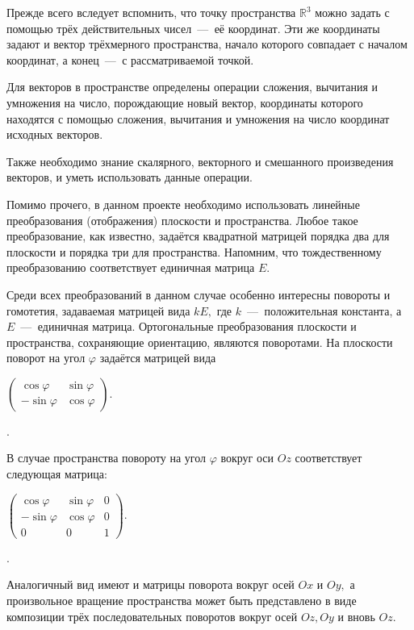 Прежде всего вследует вспомнить, что точку пространства $\mathbb R^3$ можно задать с помощью трёх действительных чисел~---  её координат. Эти же координаты задают и вектор трёхмерного пространства, начало которого совпадает с началом координат, а конец~---  с рассматриваемой точкой.

Для векторов в пространстве определены операции сложения, вычитания и умножения на число, порождающие новый вектор, координаты которого находятся с помощью сложения, вычитания и умножения на число координат исходных векторов.

Также необходимо знание  скалярного, векторного и смешанного произведения векторов, и уметь использовать данные операции.

 Помимо прочего, в данном проекте необходимо использовать линейные преобразования (отображения) плоскости и пространства. Любое такое преобразование, как известно, задаётся квадратной матрицей порядка два для плоскости и порядка три для пространства. Напомним, что тождественному преобразованию соответствует единичная матрица $E$.

Среди всех преобразований в данном случае особенно интересны повороты и гомотетия, задаваемая матрицей вида $kE,$ где $k$~---  положительная константа, а $E$~---  единичная матрица.  
Ортогональные преобразования плоскости и пространства, сохраняющие ориентацию, являются поворотами. На плоскости поворот на угол $\varphi$ задаётся матрицей вида

\begin{center}
$\begin{pmatrix}\cos\varphi&\sin\varphi\\ -\sin\varphi&\cos\varphi\end{pmatrix}.$
\end{center}.

В случае пространства повороту на угол $\varphi$ вокруг оси $Oz$ соответствует следующая матрица: 
\begin{center}
$\begin{pmatrix}\cos\varphi& \sin\varphi & 0 \\ -\sin\varphi&\cos\varphi& 0\\
0 & 0 & 1\end{pmatrix}.$
\end{center}.

Аналогичный вид имеют и матрицы поворота вокруг осей $Ox$ и $Oy,$ а произвольное вращение пространства может быть представлено в виде композиции трёх последовательных поворотов вокруг осей $Oz, Oy$ и вновь $Oz$.

